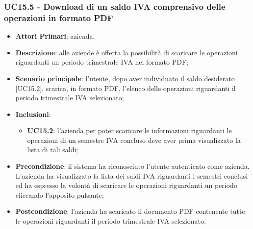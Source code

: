 \subsubsection{UC15.5 - Download di un saldo IVA comprensivo delle operazioni in formato PDF}
\begin{itemize}
	\item \textbf{Attori Primari}: azienda;
	\item \textbf{Descrizione}: alle aziende è offerta la possibilità di scaricare le operazioni riguardanti un periodo trimestrale IVA nel formato PDF;
	\item \textbf{Scenario principale}: l'utente, dopo aver individuato il saldo desiderato [UC15.2], scarica, in formato PDF, l'elenco delle operazioni riguardanti il periodo trimestrale IVA selezionato;
	\item \textbf{Inclusioni}:
	\begin{itemize}
		\item \textbf{UC15.2}: l'azienda per poter scaricare le informazioni riguardanti le operazioni di un semestre IVA concluso deve aver prima visualizzato la lista di tali saldi;
	\end{itemize}
	\item \textbf{Precondizione}: il sistema ha riconosciuto l'utente autenticato come azienda. L'azienda ha visualizzato la lista dei saldi IVA riguardanti i semestri conclusi ed ha espresso la volontà di scaricare le operazioni riguardanti un periodo cliccando l'apposito pulsante;
	\item \textbf{Postcondizione}: l'azienda ha scaricato il documento PDF contenente tutte le operazioni riguardanti il periodo trimestrale IVA selezionato.
\end{itemize} 
